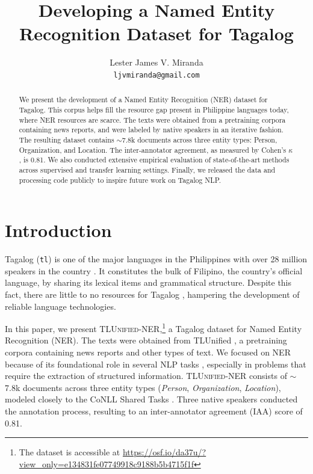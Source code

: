 \documentclass[11pt]{article}
\title{Developing a Named Entity Recognition Dataset for Tagalog}
\author{Lester James V. Miranda \\
  \texttt{ljvmiranda@gmail.com} \\}
\begin{document}
\newcommand{\tlunified}{\textsc{TLUnified-NER}}

\maketitle
\begin{abstract}
  We present the development of a Named Entity Recognition (NER) dataset for Tagalog.
  This corpus helps fill the resource gap present in Philippine languages today, where NER resources are scarce.
  The texts were obtained from a pretraining corpora containing news reports, and were labeled by native speakers in an iterative fashion.
  The resulting dataset contains $\sim$7.8k documents across three entity types: Person, Organization, and Location.
  The inter-annotator agreement, as measured by Cohen's $\kappa$, is 0.81.
  We also conducted extensive empirical evaluation of state-of-the-art methods across supervised and transfer learning settings.
  Finally, we released the data and processing code publicly to inspire future work on Tagalog NLP.
\end{abstract}

\section{Introduction}

Tagalog (\texttt{tl}) is one of the major languages in the Philippines with over 28 million speakers in the country \cite{Lewis2009EthnologueL}. 
It constitutes the bulk of Filipino, the country's official language, by sharing its lexical items and grammatical structure.
Despite this fact, there are little to no resources for Tagalog \cite{Cruz2021ImprovingLL}, hampering the development of reliable language technologies.

In this paper, we present \tlunified{},\footnote[1]{The dataset is accessible at \url{https://osf.io/da37u/?view_only=e134831fe07749918c9188b5b4715f1f}} a Tagalog dataset for Named Entity Recognition (NER).
The texts were obtained from TLUnified \cite{Cruz2021ImprovingLL}, a pretraining corpora containing news reports and other types of text.
We focused on NER because of its foundational role in several NLP tasks \citep{Sang2003IntroductionTT,Lample2016NeuralAF}, especially in problems that require the extraction of structured information. 
\tlunified{} consists of $\sim$7.8k documents across three entity types (\textit{Person}, \textit{Organization}, \textit{Location}), modeled closely to the CoNLL Shared Tasks \cite{Sang2002IntroductionTT,Sang2003IntroductionTT}.
Three native speakers conducted the annotation process, resulting to an inter-annotator agreement (IAA) score of 0.81.
\end{document}
